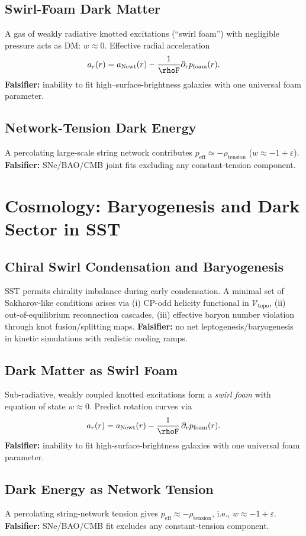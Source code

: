 \documentclass[10pt,reprint,aps,onecolumn,nofootinbib]{revtex4-2}
\begin{document}
\subsection{Swirl-Foam Dark Matter}
    A gas of weakly radiative knotted excitations (“swirl foam”) with negligible pressure acts as DM: \(w\approx 0\).
    Effective radial acceleration
    \[
        a_r(r)=a_{\text{Newt}}(r)-\frac{1}{\rhoF}\partial_r p_{\text{foam}}(r).
    \]
    \textbf{Falsifier:} inability to fit high–surface-brightness galaxies with one universal foam parameter.

\subsection{Network-Tension Dark Energy}
    A percolating large-scale string network contributes \(p_{\text{eff}}\simeq -\rho_{\text{tension}}\) (\(w\approx -1+\varepsilon\)).
    \textbf{Falsifier:} SNe/BAO/CMB joint fits excluding any constant-tension component.


\section{Cosmology: Baryogenesis and Dark Sector in SST}
\label{sec:SST-cosmology}

\subsection{Chiral Swirl Condensation and Baryogenesis}
    SST permits chirality imbalance during early condensation. A minimal set of Sakharov-like conditions arises via (i) CP-odd helicity functional in $\mathcal{V}_{\text{topo}}$, (ii) out-of-equilibrium reconnection cascades, (iii) effective baryon number violation through knot fusion/splitting maps. \textbf{Falsifier:} no net leptogenesis/baryogenesis in kinetic simulations with realistic cooling ramps.

\subsection{Dark Matter as Swirl Foam}
    Sub-radiative, weakly coupled knotted excitations form a \emph{swirl foam} with equation of state $w\approx 0$. Predict rotation curves via
    \[
        a_r(r)=a_{\text{Newt}}(r)-\frac{1}{\rhoF}\,\partial_r p_{\text{foam}}(r).
    \]
    \textbf{Falsifier:} inability to fit high-surface-brightness galaxies with one universal foam parameter.

\subsection{Dark Energy as Network Tension}
    A percolating string-network tension gives $p_{\text{eff}}\approx -\rho_{\text{tension}}$, i.e., $w\approx -1+\varepsilon$. \textbf{Falsifier:} SNe/BAO/CMB fit excludes any constant-tension component.
\end{document}
